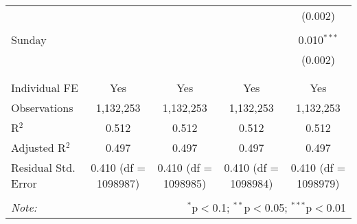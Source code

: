 \documentclass[
]{article}
\begin{document}
\begin{table}[!htbp]
{\begin{tabular}{@{\extracolsep{5pt}}lcccc}
  &  &  &  & (0.002) \\ 
  & & & & \\ 
 Sunday &  &  &  & 0.010$^{***}$ \\ 
  &  &  &  & (0.002) \\ 
  & & & & \\ 
\hline \\[-1.8ex] 
Individual FE & Yes & Yes & Yes & Yes \\ 
Observations & 1,132,253 & 1,132,253 & 1,132,253 & 1,132,253 \\ 
R$^{2}$ & 0.512 & 0.512 & 0.512 & 0.512 \\ 
Adjusted R$^{2}$ & 0.497 & 0.497 & 0.497 & 0.497 \\ 
Residual Std. Error & 0.410 (df = 1098987) & 0.410 (df = 1098985) & 0.410 (df = 1098984) & 0.410 (df = 1098979) \\ 
\hline 
\hline \\[-1.8ex] 
\textit{Note:}  & \multicolumn{4}{r}{$^{*}$p$<$0.1; $^{**}$p$<$0.05; $^{***}$p$<$0.01} \\ 
\end{tabular}
} 
\end{table} 
\newpage
\end{document}

